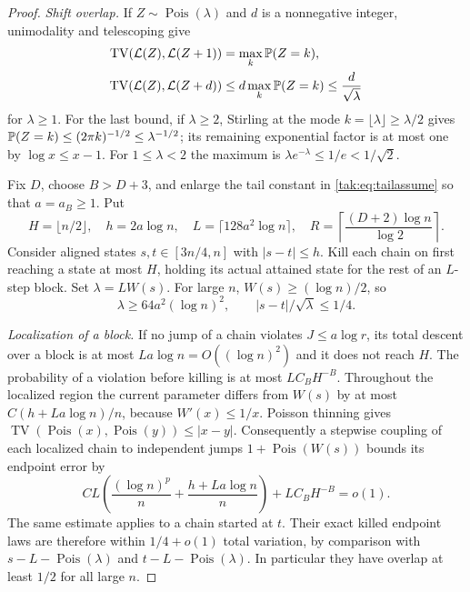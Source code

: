 \documentclass[11pt,letterpaper]{article}
\theoremstyle{remark}\newtheorem{remark}[theorem]{Remark}
\newcommand{\TV}{\operatorname{TV}}\newcommand{\Pois}{\operatorname{Pois}}
\begin{document}
\begin{proof}
\textit{Shift overlap.} If $Z\sim\Pois(\lambda)$ and $d$ is a nonnegative integer, unimodality and telescoping give
\begin{align*}
 \TV(\cL(Z),\cL(Z+1))&=\max_k\Pp(Z=k),\\
 \TV(\cL(Z),\cL(Z+d))&\leq d\max_k\Pp(Z=k)\leq\frac d{\sqrt\lambda}
\end{align*}
for $\lambda\geq1$. For the last bound, if $\lambda\geq2$, Stirling at the mode $k=\lfloor\lambda\rfloor\geq\lambda/2$ gives
$\mathbb P(Z=k)\leq(2\pi k)^{-1/2}\leq\lambda^{-1/2}$; its remaining exponential factor is at most one by $\log x\leq x-1$. For $1\leq\lambda<2$ the maximum is $\lambda e^{-\lambda}\leq1/e<1/\sqrt2$.

Fix $D$, choose $B>D+3$, and enlarge the tail constant in \eqref{tak:eq:tailassume} so that $a=a_B\geq1$. Put
\begin{equation}
 H=\lfloor n/2\rfloor,\quad h=2a\log n,\quad
 L=\lceil128a^2\log n\rceil,\quad
 R=\left\lceil\frac{(D+2)\log n}{\log2}\right\rceil.\label{tak:eq:blocks}
\end{equation}
Consider aligned states $s,t\in[3n/4,n]$ with $|s-t|\leq h$. Kill each chain on first reaching a state at most $H$, holding its actual attained state for the rest of an $L$-step block. Set $\lambda=LW(s)$. For large $n$, $W(s)\geq(\log n)/2$, so
\[
 \lambda\geq64a^2(\log n)^2,\qquad |s-t|/\sqrt\lambda\leq1/4.
\]

\textit{Localization of a block.} If no jump of a chain violates $J\leq a\log r$, its total descent over a block is at most $La\log n=O((\log n)^2)$ and it does not reach $H$. The probability of a violation before killing is at most $LC_BH^{-B}$. Throughout the localized region the current parameter differs from $W(s)$ by at most
$C(h+La\log n)/n$, because $W'(x)\leq1/x$.
Poisson thinning gives $\TV(\Pois(x),\Pois(y))\leq|x-y|$. Consequently a stepwise coupling of each localized chain to independent jumps $1+\Pois(W(s))$ bounds its endpoint error by
\begin{equation}
 CL\left(\frac{(\log n)^p}{n}+\frac{h+La\log n}{n}\right)
       +LC_BH^{-B}=o(1).\label{tak:eq:blockerror}
\end{equation}
The same estimate applies to a chain started at $t$. Their exact killed endpoint laws are therefore within $1/4+o(1)$ total variation, by comparison with
$s-L-\Pois(\lambda)$ and $t-L-\Pois(\lambda)$. In particular they have overlap at least $1/2$ for all large $n$.


\end{proof}
\end{document}
